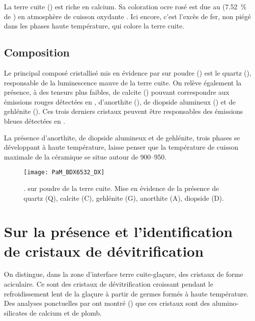 La terre cuite () est riche en calcium. 
Sa coloration ocre rosé est due au  (\SI{7.52}{\percent} 
de ) en atmosphère de cuisson oxydante 
\autocite{Echallier_1984}. Ici encore, c'est l'excès de fer, non 
piégé dans les phases haute température, qui colore la terre cuite.

\subsection{Composition \cristallo}
Le principal composé cristallisé mis en évidence par \DX sur poudre 
() est le quartz (\quartz), responsable de la luminescence 
mauve de la terre cuite. On relève également la présence, à des teneurs 
plus faibles, de calcite (\calcite) pouvant correspondre aux émissions 
rouges détectées en \CL, d'anorthite (\anorthite), de diopside alumineux 
(\diopsideal) et de gehlénite (\gehlenite). Ces trois derniers cristaux 
peuvent être responsables des émissions bleues détectées en \CL.

La présence d'anorthite, de diopside alumineux et de gehlénite, 
trois phases se développant à haute température, laisse penser que 
la température de cuisson maximale de la céramique se situe autour 
de \SIrange[range-phrase=\ à\ ]{900}{950}{\degC}.

\begin{figure}[htb]
  \texttt{[image: PaM\_BDX6532\_DX]}
  \caption[\ -- Diffraction de \RX sur poudre 
           de la terre cuite]
          {\legendeE.
           \DX[D] sur poudre de la terre cuite. 
           Mise en évidence de la présence de quartz (Q), 
           calcite (C), gehlénite (G), anorthite (A), diopside (D).}
  \label{DRX:6532}
\end{figure}


\section{Sur la présence et l'identification de cristaux de 
         dévitrification}

On distingue, dans la zone d'interface terre cuite-glaçure, des 
cristaux de forme aciculaire. Ce sont des cristaux de dévitrification 
croissant pendant le refroidissement lent de la glaçure à partir de 
germes formés à haute température. Des analyses ponctuelles par \EDS 
ont montré () que ces cristaux sont des 
alumino-silicates de calcium et de plomb.

